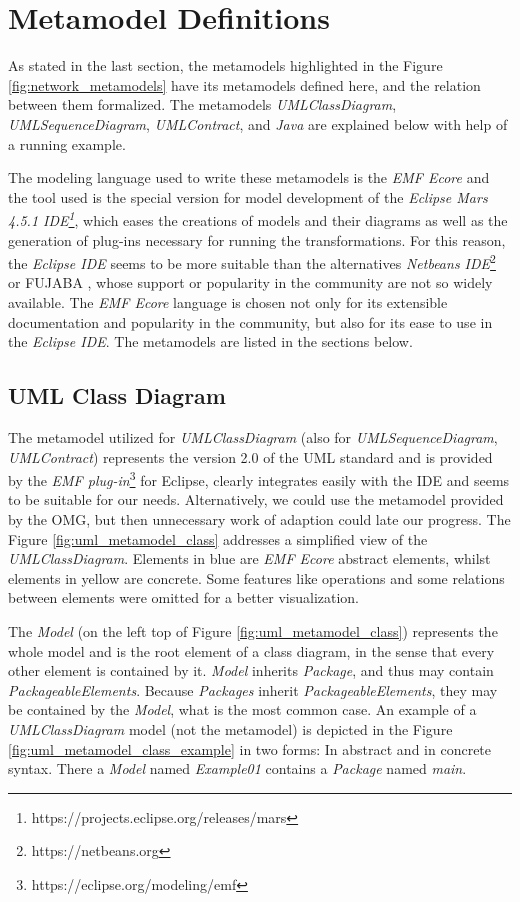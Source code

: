 \documentclass[tuberlin,cic,tc,english,noabntcite]{iiufrgs}
\begin{document}
\section{Metamodel Definitions}
As stated in the last section, the metamodels highlighted in the Figure \ref{fig:network_metamodels} have its metamodels defined here, and the relation between them formalized. The metamodels \emph{UMLClassDiagram}, \emph{UMLSequenceDiagram}, \emph{UMLContract}, and \emph{Java} are explained below with help of a running example.

The modeling language used to write these metamodels is the \emph{EMF Ecore} and the tool used is the special version for model development of the \emph{Eclipse Mars 4.5.1 IDE\footnote{https://projects.eclipse.org/releases/mars}}, which eases the creations of models and their diagrams as well as the generation of plug-ins necessary for running the transformations. For this reason, the \emph{Eclipse IDE} seems to be more suitable than the alternatives \emph{Netbeans IDE}\footnote{https://netbeans.org} or FUJABA \citep{nickel2000fujaba}, whose support or popularity in the community are not so widely available. The \emph{EMF Ecore} language is chosen not only for its extensible documentation and popularity in the community, but also for its ease to use in the \emph{Eclipse IDE}. The metamodels are listed in the sections below.

\subsection{UML Class Diagram}
The metamodel utilized for \emph{UMLClassDiagram} (also for \emph{UMLSequenceDiagram}, \emph{UMLContract}) represents the version 2.0 of the UML standard and is provided by the \emph{EMF plug-in}\footnote{https://eclipse.org/modeling/emf} for Eclipse, clearly integrates easily with the IDE and seems to be suitable for our needs. Alternatively, we could use the metamodel provided by the OMG, but then unnecessary work of adaption could late our progress. The Figure \ref{fig:uml_metamodel_class} addresses a simplified view of the \emph{UMLClassDiagram}. Elements in blue are \emph{EMF Ecore} abstract elements, whilst elements in yellow are concrete. Some features like operations and some relations between elements were omitted for a better visualization. 

The \emph{Model} (on the left top of Figure \ref{fig:uml_metamodel_class}) represents the whole model and is the root element of a class diagram, in the sense that every other element is contained by it. \emph{Model} inherits \emph{Package}, and thus may contain \emph{PackageableElements}. Because \emph{Packages} inherit \emph{PackageableElements}, they may be contained by the \emph{Model}, what is the most common case. An example of a \emph{UMLClassDiagram} model (not the metamodel) is depicted in the Figure \ref{fig:uml_metamodel_class_example} in two forms: In abstract and in concrete syntax. There a \emph{Model} named \emph{Example01} contains a \emph{Package} named \emph{main}.
\end{document}
